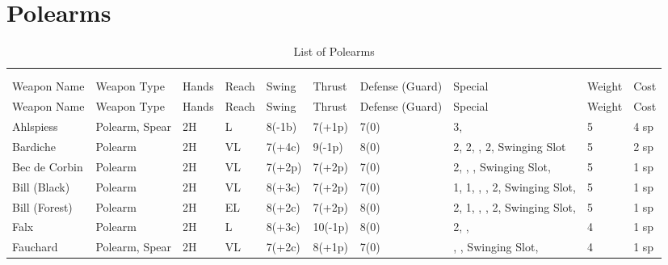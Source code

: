 \documentclass[oneside,11pt,english]{book}
\begin{document}
\section{Polearms}\vspace{-15pt}
\begin{longtabu} to 1\linewidth {X[2,l]XX[-1,c]X[-1,c]XXX[-1,c]X[2,l]X[-3,c]X[-3,r]}
  \captionsetup{labelformat=blank,textformat=empty}
  \caption{List of Polearms}\vspace{-15pt}\\
  \label{tab:Polearms}\\
  Weapon Name						&Weapon Type	&Hands&Reach&Swing&Thrust&Defense (Guard)&Special						&Weight	&Cost\\\toprule\endfirsthead
  Weapon Name						&Weapon Type			&Hands	&Reach	&Swing		&Thrust		&Defense (Guard)	&Special																	&Weight	&Cost\\\toprule\endhead
  Ahlspiess						&Polearm, Spear 		&2H		&L		&8(-1b)		&7(+1p)		&7(0)				& 3,														&5		&4 sp\\
  Bardiche						&Polearm				&2H		&VL		&7(+4c)		&9(-1p)		&8(0)				& 2,  2, ,  2, Swinging Slot				&5		&2 sp\\
  Bec de Corbin					&Polearm				&2H		&VL		&7(+2p)		&7(+2p)		&7(0)				& 2, , , Swinging Slot, 					&5		&1 sp\\
  Bill (Black)					&Polearm				&2H		&VL		&8(+3c)		&7(+2p)		&7(0)				& 1,  1, , ,  2, Swinging Slot,		&5		&1 sp\\
  Bill (Forest)					&Polearm				&2H		&EL		&8(+2c)		&7(+2p)		&8(0)				& 2,  1, , ,  2, Swinging Slot,		&5		&1 sp\\
  Falx							&Polearm				&2H		&L		&8(+3c)		&10(-1p)	&8(0)				& 2, , 									&4		&1 sp\\
  Fauchard 						&Polearm, Spear			&2H		&VL		&7(+2c)		&8(+1p) 	&7(0)				&, , Swinging Slot,								&4		&1 sp\\

\end{longtabu}
\end{document}
